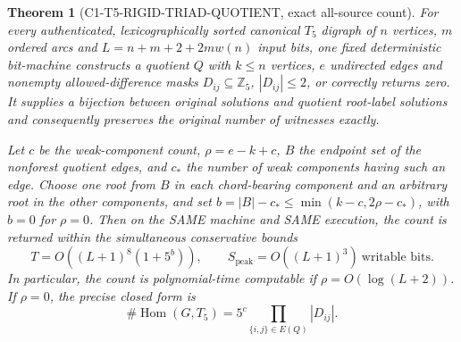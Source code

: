 \documentclass[11pt]{article}
\newtheorem{theorem}{Theorem}
\begin{document}
\begin{theorem}[C1-T5-RIGID-TRIAD-QUOTIENT, exact all-source count]
For every authenticated, lexicographically sorted canonical
$T_5$ digraph of $n$ vertices, $m$ ordered arcs and
$L=n+m+2+2mw(n)$ input bits, one fixed deterministic bit-machine
constructs a quotient $Q$ with $k\le n$ vertices, $e$ undirected
edges and nonempty allowed-difference masks
$D_{ij}\subseteq\mathbb Z_5$, $|D_{ij}|\le2$, or correctly
returns zero. It supplies a bijection between original solutions
and quotient root-label solutions and consequently preserves the
original number of witnesses \emph{exactly}.

Let $c$ be the weak-component count, $\rho=e-k+c$, $B$ the
endpoint set of the nonforest quotient edges, and $c_*$ the
number of weak components having such an edge.
Choose one root from $B$ in each chord-bearing component and
an arbitrary root in the other components, and set
$b=|B|-c_*\le\min(k-c,2\rho-c_*)$, with $b=0$ for $\rho=0$.
Then on the SAME machine and SAME execution, the count is returned
within the simultaneous conservative bounds
\[
 T=O((L+1)^8(1+5^b)),\qquad
 S_{\mathrm{peak}}=O((L+1)^3)\ \text{writable bits}.
\]
In particular, the count is polynomial-time computable if
$\rho=O(\log(L+2))$. If $\rho=0$, the precise closed form is
\[
 \boxed{\#\operatorname{Hom}(G,T_5)
    =5^c\prod_{\{i,j\}\in E(Q)}|D_{ij}|}.
\]
\end{theorem}
\end{document}
